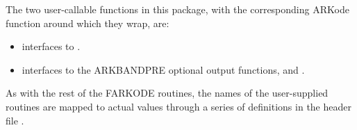 \documentclass[letterpaper,10pt,english]{sphinxmanual}
\begin{document}
The two user-callable functions in this package, with the
corresponding ARKode function around which they wrap, are:
\begin{itemize}
\item {} 
{\hyperref[f_interface/Preconditioning:f/_/FARKBPINIT]{\emph{}}} interfaces to {\hyperref[c_interface/Preconditioners:c.ARKBandPrecInit]{\emph{}}}.

\item {} 
{\hyperref[f_interface/Preconditioning:f/_/FARKBPOPT]{\emph{}}} interfaces to the ARKBANDPRE optional output
functions, {\hyperref[c_interface/Preconditioners:c.ARKBandPrecGetWorkSpace]{\emph{}}} and
{\hyperref[c_interface/Preconditioners:c.ARKBandPrecGetNumRhsEvals]{\emph{}}}.

\end{itemize}

As with the rest of the FARKODE routines, the names of the
user-supplied routines are mapped to actual values through a series of
definitions in the header file .
\end{document}
